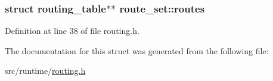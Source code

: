 \hypertarget{structroute__set_a423016a014c4eb12726597161ec0b6f9}{
\subsubsection[{routes}]{\setlength{\rightskip}{0pt plus 5cm}struct {\bf routing\-\_\-table}$\ast$$\ast$ route\-\_\-set\-::routes}}\label{structroute__set_a423016a014c4eb12726597161ec0b6f9}


Definition at line 38 of file routing.\-h.



The documentation for this struct was generated from the following file\-:\begin{DoxyCompactItemize}
\item 
src/runtime/\hyperlink{routing_8h}{routing.\-h}\end{DoxyCompactItemize}
